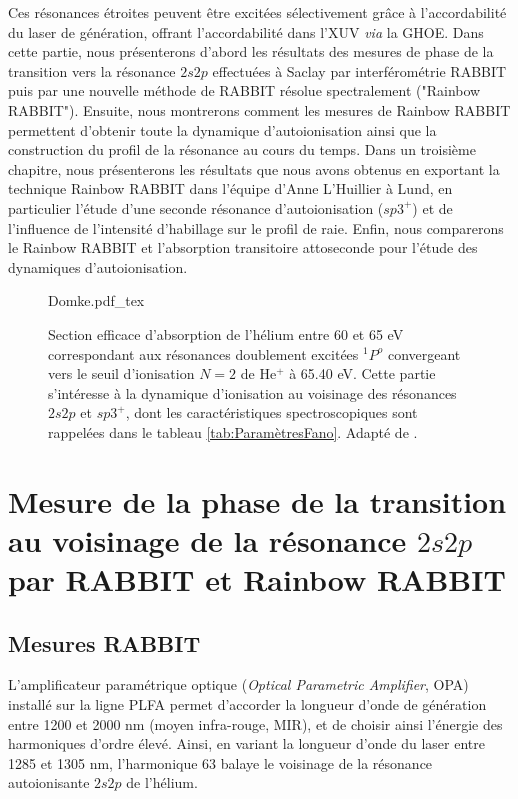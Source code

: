 Ces résonances étroites peuvent être excitées sélectivement grâce à l'accordabilité du laser de génération, offrant l'accordabilité dans l'XUV \textit{via} la GHOE. Dans cette partie, nous présenterons d'abord les résultats des mesures de phase de la transition vers la résonance $2s2p$ effectuées à Saclay par interférométrie RABBIT puis par une nouvelle méthode de RABBIT résolue spectralement ("Rainbow RABBIT"). Ensuite, nous montrerons comment les mesures de Rainbow RABBIT permettent d'obtenir toute la dynamique d'autoionisation ainsi que la construction du profil de la résonance au cours du temps. Dans un troisième chapitre, nous présenterons les résultats que nous avons obtenus en exportant la technique Rainbow RABBIT dans l'équipe d'Anne L'Huillier à Lund, en particulier l'étude d'une seconde résonance d'autoionisation ($sp3^+$) et de l'influence de l'intensité d'habillage sur le profil de raie. Enfin, nous comparerons le Rainbow RABBIT et l'absorption transitoire attoseconde pour l'étude des dynamiques d'autoionisation.

\begin{figure}[ht]
\centering
\def\svgwidth{0.5\textwidth}
{Domke.pdf_tex}
\caption{Section efficace d'absorption de l'hélium entre 60 et 65 eV correspondant aux résonances doublement excitées $^1P^o$ convergeant vers le seuil d'ionisation $N=2$ de He$^+$ à 65.40 eV. Cette partie s'intéresse à la dynamique d'ionisation au voisinage des résonances $2s2p$ et $sp3^+$, dont les caractéristiques spectroscopiques sont rappelées dans le tableau \ref{tab:ParamètresFano}. Adapté de .}
\label{fig:Domke}
\end{figure}


\chapter[Mesure de la phase de la transition au voisinage de la résonance $2s2p$ par RABBIT et Rainbow RABBIT]{Mesure de la phase de la transition au voisinage de la résonance \MakeLowercase{$2s2p$} par RABBIT et Rainbow RABBIT}
\label{chap:HeSaclay_res}
\section{Mesures RABBIT}
\label{sec:RabbitHeSaclay}
L'amplificateur paramétrique optique (\textit{Optical Parametric Amplifier}, OPA) installé sur la ligne PLFA  permet d'accorder la longueur d'onde de génération entre 1200 et 2000 nm (moyen infra-rouge, MIR), et de choisir ainsi l'énergie des harmoniques d'ordre élevé. Ainsi, en variant la longueur d'onde du laser entre 1285 et 1305 nm, l'harmonique 63 balaye le voisinage de la résonance autoionisante $2s2p$ de l'hélium. 

